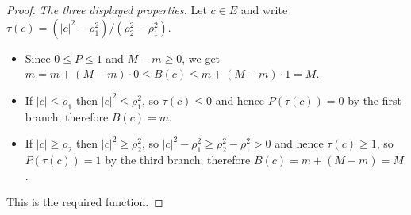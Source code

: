 \begin{proof}
\emph{The three displayed properties.} Let $c\in E$ and write
$\tau(c)=(|c|^2-\rho_1^2)/(\rho_2^2-\rho_1^2)$.
\begin{itemize}
\item Since $0\le P\le1$ and $M-m\ge0$, we get
  $m=m+(M-m)\cdot0\le B(c)\le m+(M-m)\cdot1=M$.
\item If $|c|\le\rho_1$ then $|c|^2\le\rho_1^2$, so $\tau(c)\le0$ and hence
  $P(\tau(c))=0$ by the first branch; therefore $B(c)=m$.
\item If $|c|\ge\rho_2$ then $|c|^2\ge\rho_2^2$, so
  $|c|^2-\rho_1^2\ge\rho_2^2-\rho_1^2>0$ and hence $\tau(c)\ge1$, so
  $P(\tau(c))=1$ by the third branch; therefore $B(c)=m+(M-m)=M$.
\end{itemize}
This is the required function.
\end{proof}
